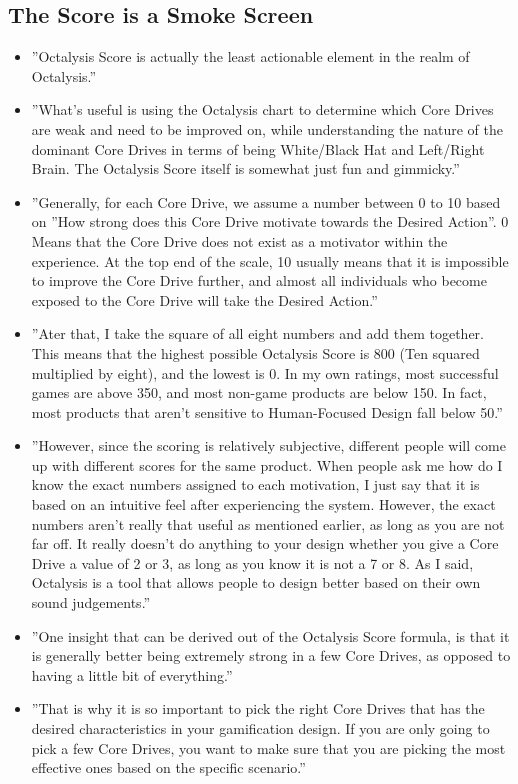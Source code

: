 \subsection{The Score is a Smoke Screen}
\begin{itemize}
    \item ''Octalysis Score is actually the least actionable element in the realm of Octalysis.''
    \item ''What's useful is using the Octalysis chart to determine which Core Drives are weak and need to be improved on, while understanding the nature of the dominant Core Drives in terms of being White/Black Hat and Left/Right Brain. The Octalysis Score itself is somewhat just fun and gimmicky.''
    \item ''Generally, for each Core Drive, we assume a number between 0 to 10 based on ''How strong does this Core Drive motivate towards the Desired Action''. 0 Means that the Core Drive does not exist as a motivator within the experience. At the top end of the scale, 10 usually means that it is impossible to improve the Core Drive further, and almost all individuals who become exposed to the Core Drive will take the Desired Action.''
    \item ''Ater that, I take the square of all eight numbers and add them together. This means that the highest possible Octalysis Score is 800 (Ten squared multiplied by eight), and the lowest is 0. In my own ratings, most successful games are above 350, and most non-game products are below 150. In fact, most products that aren't sensitive to Human-Focused Design fall below 50.''
    \item ''However, since the scoring is relatively subjective, different people will come up with different scores for the same product. When people ask me how do I know the exact numbers assigned to each motivation, I just say that it is based on an intuitive feel after experiencing the system. However, the exact numbers aren't really that useful as mentioned earlier, as long as you are not far off. It really doesn't do anything to your design whether you give a Core Drive a value of 2 or 3, as long as you know it is not a 7 or 8. As I said, Octalysis is a tool that allows people to design better based on their own sound judgements.''
    \item ''One insight that can be derived out of the Octalysis Score formula, is that it is generally better being extremely strong in a few Core Drives, as opposed to having a little bit of everything.''
    \item ''That is why it is so important to pick the right Core Drives that has the desired characteristics in your gamification design. If you are only going to pick a few Core Drives, you want to make sure that you are picking the most effective ones based on the specific scenario.''
\end{itemize}

